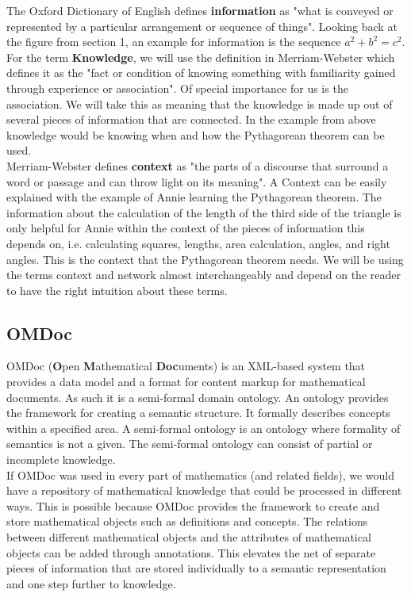 \documentclass[twoside]{article}
\begin{document}
The Oxford Dictionary of English \cite{OED:npentrel14} defines \textbf{information} as "what is conveyed or represented by a particular arrangement or sequence of things". Looking back at the figure from section 1, an example for information is the sequence \textit{$a^2 + b^2 = c^2$}. For the term \textbf{Knowledge}, we will use the definition in Merriam-Webster \cite{Webster:npentrel14} which defines it as the "fact or condition of knowing something with familiarity gained through experience or association". Of special importance for us is the association. We will take this as meaning that the knowledge is made up out of several pieces of information that are connected. In the example from above knowledge would be knowing when and how the Pythagorean theorem can be used.\\ 

Merriam-Webster \cite{Webster:npentrel14} defines \textbf{context} as "the parts of a discourse that surround a word or passage and can throw light on its meaning". A Context can be easily explained with the example of Annie learning the Pythagorean theorem. The information about the calculation of the length of the third side of the triangle is only helpful for Annie within the context of the pieces of information this depends on, i.e. calculating squares, lengths, area calculation, angles, and right angles. This is the context that the Pythagorean theorem needs. We will be using the terms context and network almost interchangeably and depend on the reader to have the right intuition about these terms.\\

\subsection{OMDoc}
OMDoc (\textbf{O}pen \textbf{M}athematical \textbf{Doc}uments) \cite{Kohlhase:OMDoc1.2} is an XML-based system that provides a data model and a format for content markup for mathematical documents. As such it is a semi-formal domain ontology. An ontology provides the framework for creating a semantic structure. It formally describes concepts within a specified area. A semi-formal ontology \cite{Sheth:npentrel14} is an ontology where formality of semantics is not a given. The semi-formal ontology can consist of partial or incomplete knowledge. \\

If OMDoc was used in every part of mathematics (and related fields), we would have a repository of mathematical knowledge that could be processed in different ways. This is possible because OMDoc provides the framework to create and store mathematical objects such as definitions and concepts. The relations between different mathematical objects and the attributes of mathematical objects can be added through annotations. This elevates the net of separate pieces of information that are stored individually to a semantic representation and one step further to knowledge.\\
\end{document}
